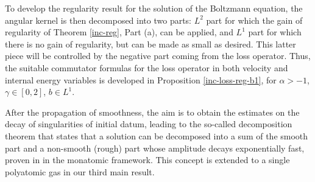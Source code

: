 \documentclass[11pt,a4paper]{amsart}
\newcommand{\g}{\gamma}
\begin{document}
To develop the regularity result for the solution of the Boltzmann equation, the angular kernel is then decomposed  into two parts: $L^2$ part for which the gain of regularity of Theorem \ref{inc-reg}, Part (a), can be applied, and  $L^1$ part for which there is no gain of regularity, but can be made as small as desired. This latter piece will be controlled by the negative part coming from the loss operator. Thus,  the suitable commutator formulas  for the loss operator in both velocity and internal energy variables is developed   in Proposition \ref{inc-loss-reg-b1}, for $\alpha>-1$, $\g \in [0,2]$, $b\in L^1$.




After the propagation of smoothness, the aim is to obtain the estimates on the decay of singularities of initial datum, leading to the so-called decomposition theorem that states that a solution can be decomposed into a sum of the smooth part and a non-smooth (rough) part whose amplitude decays exponentially fast, proven in \cite{MV,AGT} in the monatomic framework. This concept is extended to a single polyatomic gas in our third main result. 

\end{document}
